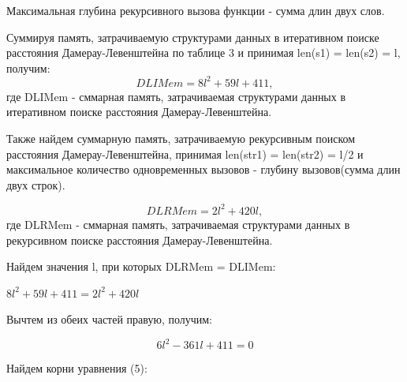 \documentclass[a4paper, 14pt]{article}
\begin{document}

		\begin{center}
	
	Максимальная глубина рекурсивного вызова функции - сумма длин двух слов. \\
	\end{center}
	 \begin{flushleft}
  Суммируя память, затрачиваемую структурами данных в итеративном поиске расстояния Дамерау-Левенштейна по таблице 3 и принимая len(s1) = len(s2) = l, получим:\\
  		\begin{equation}
			DLIMem = 8l^2 + 59l + 411,
		\end{equation}
		где DLIMem - сммарная память, затрачиваемая структурами данных в итеративном поиске расстояния Дамерау-Левенштейна.\\
		\begin{flushleft}
Также найдем суммарную память, затрачиваемую рекурсивным поиском расстояния Дамерау-Левенштейна, принимая len(str1) = len(str2) = l/2 и максимальное количество одновременных вызовов - глубину вызовов(сумма длин двух строк).
		\end{flushleft}
		\begin{equation}
			DLRMem = 2l^2 + 420l,
		\end{equation}
		где DLRMem - сммарная память, затрачиваемая структурами данных в рекурсивном поиске расстояния Дамерау-Левенштейна.\\
	\begin{flushleft}
		Найдем значения l, при которых DLRMem = DLIMem:\\
		\end{flushleft}	

		\begin{center}
				
		$8l^2 + 59l + 411 = 2l^2 + 420l$\\
		\begin{flushleft}
		Вычтем из обеих частей правую, получим:	
		\end{flushleft}
		
		\begin{equation}		
		6l^2  - 361l + 411 = 0
		\end{equation}
		\begin{flushleft}
		Найдем корни уравнения (5):\\
		\end{flushleft}
		

\end{center}
\end{flushleft}
\end{document}
